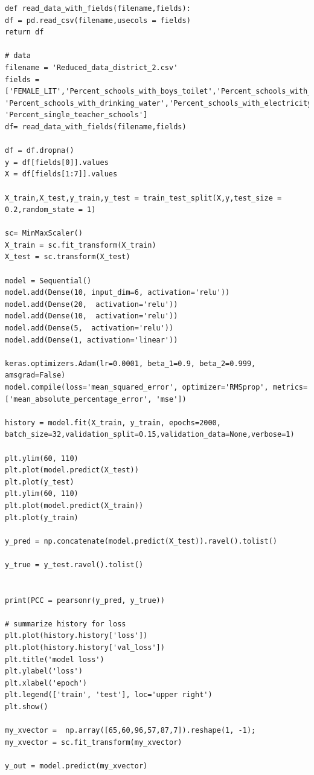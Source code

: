 \documentclass{article}
\begin{document}
\begin{appendices}
\begin{lstlisting}
def read_data_with_fields(filename,fields):
df = pd.read_csv(filename,usecols = fields)
return df

# data
filename = 'Reduced_data_district_2.csv'
fields =['FEMALE_LIT','Percent_schools_with_boys_toilet','Percent_schools_with_playground',\
'Percent_schools_with_drinking_water','Percent_schools_with_electricity','Percent_schools_with_Roads', 'Percent_single_teacher_schools']
df= read_data_with_fields(filename,fields)

df = df.dropna()
y = df[fields[0]].values
X = df[fields[1:7]].values

X_train,X_test,y_train,y_test = train_test_split(X,y,test_size = 0.2,random_state = 1)

sc= MinMaxScaler()
X_train = sc.fit_transform(X_train)
X_test = sc.transform(X_test)

model = Sequential()
model.add(Dense(10, input_dim=6, activation='relu'))
model.add(Dense(20,  activation='relu'))
model.add(Dense(10,  activation='relu'))
model.add(Dense(5,  activation='relu'))
model.add(Dense(1, activation='linear'))

keras.optimizers.Adam(lr=0.0001, beta_1=0.9, beta_2=0.999, amsgrad=False)
model.compile(loss='mean_squared_error', optimizer='RMSprop', metrics=['mean_absolute_percentage_error', 'mse'])

history = model.fit(X_train, y_train, epochs=2000, batch_size=32,validation_split=0.15,validation_data=None,verbose=1)

plt.ylim(60, 110)
plt.plot(model.predict(X_test))
plt.plot(y_test)
plt.ylim(60, 110)
plt.plot(model.predict(X_train))
plt.plot(y_train)

y_pred = np.concatenate(model.predict(X_test)).ravel().tolist()

y_true = y_test.ravel().tolist()


print(PCC = pearsonr(y_pred, y_true))

# summarize history for loss
plt.plot(history.history['loss'])
plt.plot(history.history['val_loss'])
plt.title('model loss')
plt.ylabel('loss')
plt.xlabel('epoch')
plt.legend(['train', 'test'], loc='upper right')
plt.show()

my_xvector =  np.array([65,60,96,57,87,7]).reshape(1, -1);
my_xvector = sc.fit_transform(my_xvector)

y_out = model.predict(my_xvector)

\end{lstlisting}

\pagebreak
\end{appendices}


\end{document}
